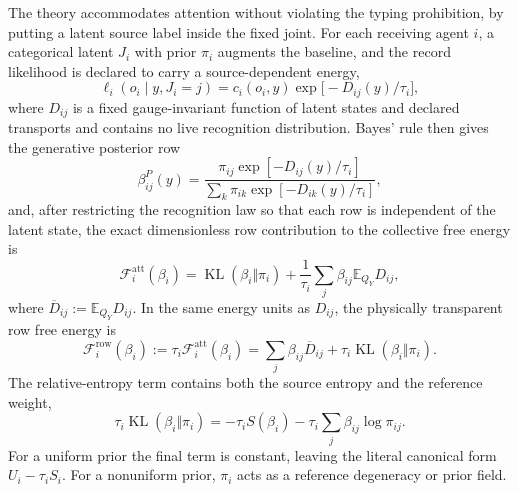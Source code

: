\documentclass[11pt,letterpaper]{article}
\newcommand{\KL}{\operatorname{KL}}
\newcommand{\Ex}{\mathbb E}
\begin{document}
The theory accommodates attention without violating the typing prohibition, by putting a latent source label inside the fixed joint. For each receiving agent \(i\), a categorical latent \(J_i\) with prior \(\pi_i\) augments the baseline, and the record likelihood is declared to carry a source-dependent energy,
\begin{equation}
  \ell_i(o_i\mid y,J_i=j)=c_i(o_i,y)\exp\bigl[-D_{ij}(y)/\tau_i\bigr],
  \label{eq:attention-likelihood}
\end{equation}
where \(D_{ij}\) is a fixed gauge-invariant function of latent states and declared transports and contains no live recognition distribution. Bayes' rule then gives the generative posterior row
\begin{equation}
  \beta^P_{ij}(y)=\frac{\pi_{ij}\exp[-D_{ij}(y)/\tau_i]}{\sum_k\pi_{ik}\exp[-D_{ik}(y)/\tau_i]},
  \label{eq:attention-posterior}
\end{equation}
and, after restricting the recognition law so that each row is independent of the latent state, the exact dimensionless row contribution to the collective free energy is
\begin{equation}
  \mathcal F_i^{\mathrm{att}}(\beta_i)=\KL(\beta_i\Vert\pi_i)
  +\frac{1}{\tau_i}\sum_j\beta_{ij}\Ex_{Q_Y}D_{ij},
  \label{eq:attention-vfe}
\end{equation}
where \(\overline D_{ij}:=\Ex_{Q_Y}D_{ij}\). In the same energy units as \(D_{ij}\), the physically transparent row free energy is
\begin{equation}
  \boxed{\mathcal F_i^{\mathrm{row}}(\beta_i)
  :=\tau_i\mathcal F_i^{\mathrm{att}}(\beta_i)
  =\sum_j\beta_{ij}\overline D_{ij}
  +\tau_i\KL(\beta_i\Vert\pi_i).}
  \label{eq:attention-row-free-energy}
\end{equation}
The relative-entropy term contains both the source entropy and the reference weight,
\begin{equation}
  \tau_i\KL(\beta_i\Vert\pi_i)
  =-\tau_i S(\beta_i)-\tau_i\sum_j\beta_{ij}\log\pi_{ij}.
  \label{eq:row-helmholtz-split}
\end{equation}
For a uniform prior the final term is constant, leaving the literal canonical form \(U_i-\tau_iS_i\). For a nonuniform prior, \(\pi_i\) acts as a reference degeneracy or prior field.
\end{document}

